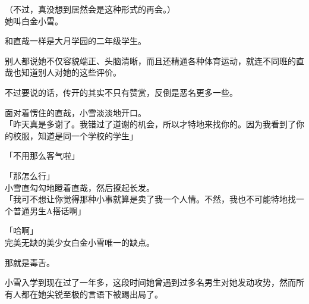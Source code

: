 （不过，真没想到居然会是这种形式的再会。）\\

她叫白金小雪。

和直哉一样是大月学园的二年级学生。

别人都说她不仅容貌端正、头脑清晰，而且还精通各种体育运动，就连不同班的直哉也知道别人对她的这些评价。

不过要说的话，传开的其实不只有赞赏，反倒是恶名更多一些。

面对着愣住的直哉，小雪淡淡地开口。\\

「昨天真是多谢了。我错过了道谢的机会，所以才特地来找你的。因为我看到了你的校服，知道是同一个学校的学生」

「不用那么客气啦」

「那怎么行」\\

小雪直勾勾地瞪着直哉，然后撩起长发。\\

「我可不想让你觉得那种小事就算是卖了我一个人情。不然，我也不可能特地找一个普通男生A搭话啊」

「哈啊」\\

完美无缺的美少女白金小雪唯一的缺点。

那就是毒舌。

小雪入学到现在过了一年多，这段时间她曾遇到过多名男生对她发动攻势，然而所有人都在她尖锐至极的言语下被踢出局了。

